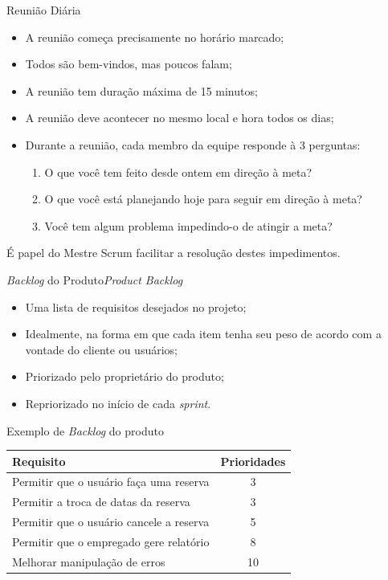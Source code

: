 \begin{frame}{Reunião Diária}\small
  \begin{itemize}[<+-| alert@+>]
  \item A reunião começa precisamente no horário marcado;
  \item Todos são bem-vindos, mas poucos falam;
  \item A reunião tem duração máxima de 15 minutos;
  \item A reunião deve acontecer no mesmo local e hora todos os dias;
  \item Durante a reunião, cada membro da equipe responde à 3 perguntas:
    \begin{enumerate}
    \item O que você tem feito desde ontem em direção à meta?
    \item O que você está planejando hoje para seguir em direção à meta?
    \item Você tem algum problema impedindo-o de atingir a meta?
    \end{enumerate}
  \end{itemize}

  \pause\bigskip
  É papel do Mestre Scrum facilitar a resolução destes impedimentos.
\end{frame}

\begin{frame}{{\em Backlog} do Produto}{{\em Product Backlog}}
  \begin{itemize}[<+-| alert@+>]
  \item Uma lista de \alert{requisitos} desejados no projeto;
  \item Idealmente, na forma em que cada item tenha seu peso de acordo com a vontade do cliente ou usuários;
  \item Priorizado pelo proprietário do produto;
  \item Repriorizado no início de cada {\em sprint}.
  \end{itemize}
\end{frame}

\begin{frame}{Exemplo de {\em Backlog} do produto}
  \begin{center}
    \begin{tabular}[ht]{|l|c|}\hline
      \bf\hfil Requisito & \bf\hfil Prioridades \\\hline
      Permitir que o usuário faça uma reserva & 3 \\\hline 
      Permitir a troca de datas da reserva & 3 \\\hline 
      Permitir que o usuário cancele a reserva & 5 \\\hline 
      Permitir que o empregado gere relatório & 8 \\\hline
      Melhorar manipulação de erros & 10 \\\hline
    \end{tabular}
  \end{center}
\end{frame}

